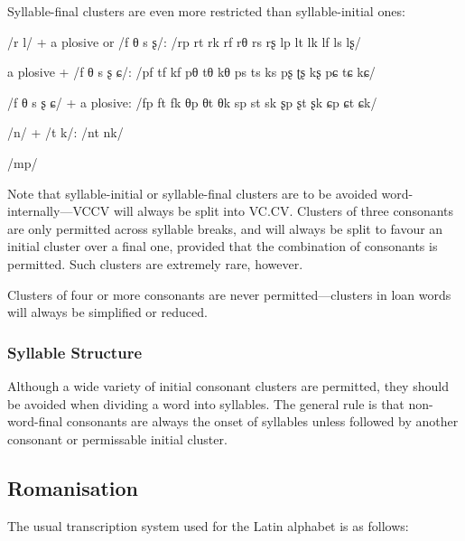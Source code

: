 \documentclass[grammar]{subfiles}
\begin{document}
	Syllable-final clusters are even more restricted than syllable-initial ones:

	\begin{itemize*}
	\item /r l/ + a plosive or /f θ s ʂ/: /rp rt rk rf rθ rs rʂ lp lt lk lf ls lʂ/
	\item a plosive + /f θ s ʂ ɕ/: /pf tf kf pθ tθ kθ ps ts ks pʂ ʈʂ kʂ pɕ tɕ kɕ/
	\item /f θ s ʂ ɕ/ + a plosive: /fp ft fk θp θt θk sp st sk ʂp ʂt ʂk ɕp ɕt ɕk/
	\item /n/ + /t k/: /nt nk/
	\item /mp/
	\end{itemize*}

	Note that syllable-initial or syllable-final clusters are to be avoided word-internally—VCCV will always be split into VC.CV\@. Clusters of three consonants are only permitted across syllable breaks, and will always be split to favour an initial cluster over a final one, provided that the combination of consonants is permitted. Such clusters are extremely rare, however.

	Clusters of four or more consonants are never permitted—clusters in loan words will always be simplified or reduced.
	
	\subsubsection{Syllable Structure}
	\label{sssec:syllables}

	Although a wide variety of initial consonant clusters are permitted, they should be avoided when dividing a word into syllables. The general rule is that non-word-final consonants are always the onset of syllables unless followed by another consonant or permissable initial cluster.

	\subsection{Romanisation}
	\label{ssec:romanisation}

	The usual transcription system used for the Latin alphabet is as follows:
\end{document}

